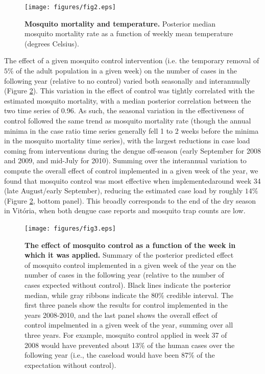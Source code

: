 \documentclass[10pt,letterpaper]{article}
\begin{document}
\begin{figure}[!h]
\texttt{[image: figures/fig2.eps]}
\caption{{\bf Mosquito mortality and temperature.}
Posterior median mosquito mortality rate as a function of weekly mean temperature (degrees Celsius).
}
\label{mortality}
\end{figure}

The effect of a given mosquito control intervention (i.e. the temporary removal of $5\%$ of the adult population in a given week) on the number of cases in the following year (relative to no control) varied both seasonally and interannually (Figure \ref{control}).
This variation in the effect of control was tightly correlated with the estimated mosquito mortality, with a median posterior correlation between the two time series of 0.96.
As such, the seasonal variation in the effectiveness of control followed the same trend as mosquito mortality rate (though the annual minima in the case ratio time series generally fell 1 to 2 weeks before the minima in the mosquito mortality time series), with the largest reductions in case load coming from interventions during the dengue off-season (early September for 2008 and 2009, and mid-July for 2010).
Summing over the interannual variation to compute the overall effect of control implemented in a given week of the year, we found that mosquito control was most effective when implementedaround  week 34 (late August/early September), reducing the estimated case load by roughly $14\%$ (Figure \ref{control}, bottom panel).
This broadly corresponds to the end of the dry season in Vit\'oria, when both dengue case reports and mosquito trap counts are low.

\begin{figure}[!h]
\texttt{[image: figures/fig3.eps]}
\caption{{\bf The effect of mosquito control as a function of the week in which it was applied.}
Summary of the posterior predicted effect of mosquito control implemented in a given week of the year on the number of cases in the following year (relative to the number of cases expected without control).
Black lines indicate the posterior median, while gray ribbons indicate the $80\%$ credible interval.
The first three panels show the results for control implemented in the years 2008-2010, and the last panel shows the overall effect of control impelmented in a given week of the year, summing over all three years.
For example, mosquito control applied in week 37 of 2008 would have prevented about 13\% of the human cases over the following year (i.e., the caseload would have been 87\% of the expectation without control).
}
\label{control}
\end{figure}
\end{document}

